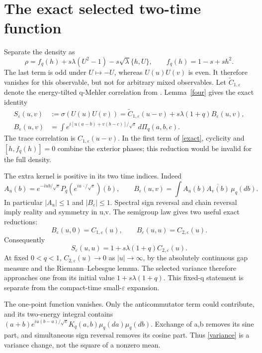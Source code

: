 \documentclass[11pt]{article}
\newcommand{\eps}{\varepsilon}
\begin{document}
\newpage
\section{The exact selected two-time function}
Separate the density as
\[
 \rho=f_q(h)+s\lambda(U^2-1)-s\sqrt\lambda\{h,U\},\qquad
 f_q(h)=1-s+sh^2.
\]
The last term is odd under $U\mapsto-U$, whereas $U(u)U(v)$
is even. It therefore vanishes for this observable, but not for
arbitrary mixed observables. Let $\widetilde C_{1,\eps}$ denote
the energy-tilted q-Mehler correlation from \cite{weighted}.
Lemma~\ref{four} gives the exact identity
\begin{align}
 S_\eps(u,v)&:=\sigma(U(u)U(v))
 =\widetilde C_{1,\eps}(u-v)+s\lambda(1+q)B_\eps(u,v),\label{exact}\\
 B_\eps(u,v)&=\int
 e^{i[u(a-b)+v(b-c)]/\sqrt\eps}\,d\Pi_q(a,b,c).\label{B}
\end{align}
The trace correlation is $C_{1,\eps}(u-v)$.
In the first term of \eqref{exact}, cyclicity and $[h,f_q(h)]=0$
combine the exterior phases; this reduction would be invalid
for the full density.

The extra kernel is positive in its two time indices. Indeed
\[
 A_u(b)=e^{-iub/\sqrt\eps}P_q(e^{iu\,\cdot/\sqrt\eps})(b),
 \qquad
 B_\eps(u,v)=\int A_u(b)\overline{A_v(b)}\,\mu_q(db).
\]
In particular $|A_u|\le1$ and $|B_\eps|\le1$. Spectral sign reversal
and chain reversal imply reality and symmetry in u,v.
The semigroup law gives two useful exact reductions:
\begin{equation}\label{slices}
 B_\eps(u,0)=C_{1,\eps}(u),\qquad
 B_\eps(u,u)=C_{2,\eps}(u).
\end{equation}
Consequently
\begin{equation}\label{variance}
 S_\eps(u,u)=1+s\lambda(1+q)C_{2,\eps}(u).
\end{equation}
At fixed $0<q<1$, $C_{2,\eps}(u)\to0$ as $|u|\to\infty$,
by the absolutely continuous gap measure and the
Riemann--Lebesgue lemma. The selected variance therefore
approaches one from its initial value $1+s\lambda(1+q)$.
This fixed-q statement is separate from the compact-time
small-$\eps$ expansion.

The one-point function vanishes. Only the anticommutator term
could contribute, and its two-energy integral contains
$(a+b)e^{iu(b-a)/\sqrt\eps}K_q(a,b)\mu_q(da)\mu_q(db)$.
Exchange of a,b removes its sine part, and simultaneous sign
reversal removes its cosine part. Thus \eqref{variance} is a
variance change, not the square of a nonzero mean.
\end{document}
